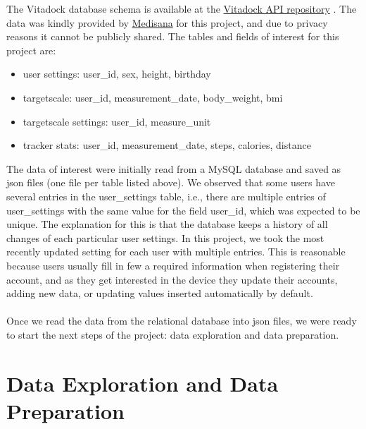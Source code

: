 \documentclass[11pt]{iopart}
\begin{document}
The  Vitadock database schema is available at the \href{https://github.com/Medisana/vitadock-api/wiki/DATA-MODEL-(all-modules)}{Vitadock API repository} .
The data was kindly provided by \href{http://www.medisana.de/}{Medisana\textregistered} for this project, and due to privacy reasons it cannot be publicly shared.
The tables and fields of interest for this project are: 
\begin{itemize}
\item user settings: user\_id, sex, height, birthday
\item targetscale: user\_id, measurement\_date, body\_weight, bmi
\item targetscale settings: user\_id, measure\_unit
\item tracker stats: user\_id, measurement\_date, steps, calories, distance
\end{itemize} 
The data of interest were initially read from a MySQL database and saved as json files (one file per table listed above).
We observed that some users have several entries in the user\_settings table, i.e., there are multiple entries of user\_settings with the same value for the field user\_id,
which was expected to be unique.
The explanation for this is that the database keeps a history of all changes of each particular user settings.
In this project, we took the most recently updated setting for each user with multiple entries. 
This is reasonable because users usually fill in few a required information when registering their account, and as they get interested in the device they update their accounts, adding new data, or updating values inserted automatically by default. 
\\ \\
Once we read the data from the relational database into json files, we were ready to start the next steps of the project: data exploration and data preparation.

\section{Data Exploration and Data Preparation}
\end{document}
